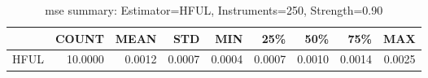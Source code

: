 \begin{table}[ht]
\centering
\caption{mse summary: Estimator=HFUL, Instruments=250, Strength=0.90}
\begin{tabular}{lrrrrrrrr}
\toprule
 & COUNT & MEAN & STD & MIN & 25\% & 50\% & 75\% & MAX \\
\midrule
HFUL & 10.0000 & 0.0012 & 0.0007 & 0.0004 & 0.0007 & 0.0010 & 0.0014 & 0.0025 \\
\bottomrule
\end{tabular}
\end{table}
